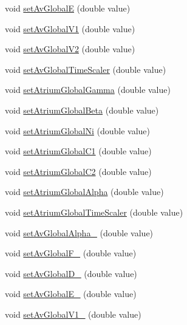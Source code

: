 \begin{DoxyCompactItemize}
void \hyperlink{classatrial_parameters_a3a71ae994474119d5b481225b687733c}{set\+Av\+Global\+E} (double value)
\item 
void \hyperlink{classatrial_parameters_a28b1fbc725ef53ec978dbf46db2f9324}{set\+Av\+Global\+V1} (double value)
\item 
void \hyperlink{classatrial_parameters_ae725daa5fc0b643658308a3f21d3d792}{set\+Av\+Global\+V2} (double value)
\item 
void \hyperlink{classatrial_parameters_a9d98fa5d7e0d234cdc2a1011d07be4d7}{set\+Av\+Global\+Time\+Scaler} (double value)
\item 
void \hyperlink{classatrial_parameters_a59022c60d080766027ba858f721566c7}{set\+Atrium\+Global\+Gamma} (double value)
\item 
void \hyperlink{classatrial_parameters_a28e741282c70b4051cbe947da9c73381}{set\+Atrium\+Global\+Beta} (double value)
\item 
void \hyperlink{classatrial_parameters_ac3ab123a68d6818ba5d5a04e091b936d}{set\+Atrium\+Global\+Ni} (double value)
\item 
void \hyperlink{classatrial_parameters_a29786fb5f5b2e5995f064c2d4f71f2f5}{set\+Atrium\+Global\+C1} (double value)
\item 
void \hyperlink{classatrial_parameters_a2531ce977adbc7e06959fb0e8254cced}{set\+Atrium\+Global\+C2} (double value)
\item 
void \hyperlink{classatrial_parameters_a7b26befa3c022befa5eda7408920d379}{set\+Atrium\+Global\+Alpha} (double value)
\item 
void \hyperlink{classatrial_parameters_ac0c7bbe4dcbf683207f9002b47729853}{set\+Atrium\+Global\+Time\+Scaler} (double value)
\item 
void \hyperlink{classatrial_parameters_a6ebc25960fcf64eedf8c8cfc69b50f72}{set\+Av\+Global\+Alpha\+\_} (double value)
\item 
void \hyperlink{classatrial_parameters_a82bf0b71848b0702e1b82045809939ac}{set\+Av\+Global\+F\+\_} (double value)
\item 
void \hyperlink{classatrial_parameters_a8c4335fa40ad96dd29f37c08b8ed5765}{set\+Av\+Global\+D\+\_} (double value)
\item 
void \hyperlink{classatrial_parameters_a2fcbd84425603c3dbe27fdaee99c8991}{set\+Av\+Global\+E\+\_} (double value)
\item 
void \hyperlink{classatrial_parameters_a4d325be618a9fa4b0a42976d602b1560}{set\+Av\+Global\+V1\+\_} (double value)
\item 

\end{DoxyCompactItemize}
